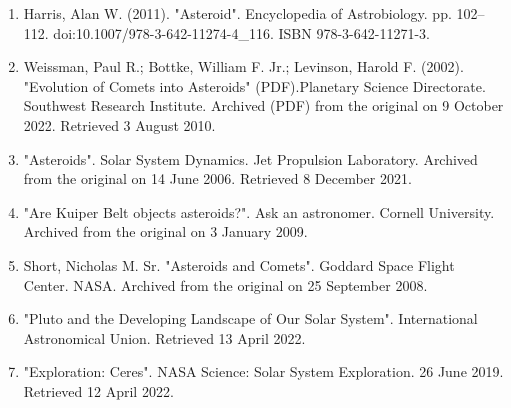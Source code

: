 \begin{enumerate}
\item Harris, Alan W. (2011). "Asteroid". Encyclopedia of Astrobiology. pp. 102–112. doi:10.1007/978-3-642-11274-4_116. ISBN 978-3-642-11271-3.
\item Weissman, Paul R.; Bottke, William F. Jr.; Levinson, Harold F. (2002). "Evolution of Comets into Asteroids" (PDF).Planetary Science Directorate. Southwest Research Institute. Archived (PDF) from the original on 9 October 2022. Retrieved 3 August 2010.
\item "Asteroids". Solar System Dynamics. Jet Propulsion Laboratory. Archived from the original on 14 June 2006. Retrieved 8 December 2021.
\item "Are Kuiper Belt objects asteroids?". Ask an astronomer. Cornell University. Archived from the original on 3 January 2009.
\item Short, Nicholas M. Sr. "Asteroids and Comets". Goddard Space Flight Center. NASA. Archived from the original on 25 September 2008.
\item "Pluto and the Developing Landscape of Our Solar System". International Astronomical Union. Retrieved 13 April 2022.
\item "Exploration: Ceres". NASA Science: Solar System Exploration. 26 June 2019. Retrieved 12 April 2022.
\end{enumerate}
